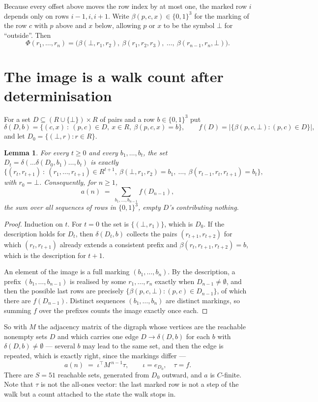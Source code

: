 \documentclass[11pt,a4paper]{article}
\theoremstyle{plain}
\newtheorem{lemma}[theorem]{Lemma}
\theoremstyle{definition}
\begin{document}
Because every offset above moves the row index by at most one, the marked row $i$ depends only
on rows $i-1,i,i+1$. Write $\beta(p,c,x)\in\{0,1\}^{3}$ for the marking of the row $c$
with $p$ above and $x$ below, allowing $p$ or $x$ to be the symbol $\bot$ for ``outside''.
Then
\[
\Phi(r_1,\dots,r_n)=\bigl(\beta(\bot,r_1,r_2),\ \beta(r_1,r_2,r_3),\ \dots,\
\beta(r_{n-1},r_n,\bot)\bigr).
\]

\section{The image is a walk count after determinisation}

For a set $D\subseteq(R\cup\{\bot\})\times R$ of pairs and a row $b\in\{0,1\}^{3}$ put
\[
\delta(D,b)=\{(c,x)\ :\ (p,c)\in D,\ x\in R,\ \beta(p,c,x)=b\},\qquad
f(D)=\bigl|\{\beta(p,c,\bot):(p,c)\in D\}\bigr| ,
\]
and let $D_0=\{(\bot,r):r\in R\}$.

\begin{lemma}\label{lem:det}
For every $t\ge0$ and every $b_1,\dots,b_t$, the set
$D_t=\delta(\dots\delta(D_0,b_1)\dots,b_t)$ is exactly
\[
\{(r_t,r_{t+1})\ :\ (r_1,\dots,r_{t+1})\in R^{t+1},\ \beta(\bot,r_1,r_2)=b_1,\ \dots,\
\beta(r_{t-1},r_t,r_{t+1})=b_t\} ,
\]
with $r_0=\bot$. Consequently, for $n\ge1$,
\[
a(n)\;=\;\sum_{b_1,\dots,b_{n-1}}f(D_{n-1}),
\]
the sum over all sequences of rows in $\{0,1\}^{3}$, empty $D$'s contributing nothing.
\end{lemma}

\begin{proof}
Induction on $t$. For $t=0$ the set is $\{(\bot,r_1)\}$, which is $D_0$. If the description
holds for $D_t$, then $\delta(D_t,b)$ collects the pairs $(r_{t+1},r_{t+2})$ for which
$(r_t,r_{t+1})$ already extends a consistent prefix and
$\beta(r_t,r_{t+1},r_{t+2})=b$, which is the description for $t+1$.

An element of the image is a full marking $(b_1,\dots,b_n)$. By the description, a prefix
$(b_1,\dots,b_{n-1})$ is realised by some $r_1,\dots,r_n$ exactly when $D_{n-1}\neq
\emptyset$, and then the possible last rows are precisely
$\{\beta(p,c,\bot):(p,c)\in D_{n-1}\}$, of which there are $f(D_{n-1})$. Distinct
sequences $(b_1,\dots,b_n)$ are distinct markings, so summing $f$ over the prefixes counts the
image exactly once each.
\end{proof}

So with $M$ the adjacency matrix of the digraph whose vertices are the reachable nonempty sets
$D$ and which carries one edge $D\to\delta(D,b)$ for each $b$ with $\delta(D,b)\neq\emptyset$
--- several $b$ may lead to the same set, and then the edge is repeated, which is exactly
right, since the markings differ ---
\[
a(n)\;=\;\iota^{\!\top}M^{\,n-1}\tau,\qquad \iota=e_{D_0},\quad \tau=f .
\]
There are $S=51$ reachable sets, generated from $D_0$ outward, and $a$ is $C$-finite. Note
that $\tau$ is not the all-ones vector: the last marked row is not a step of the walk but a
count attached to the state the walk stops in.
\end{document}
